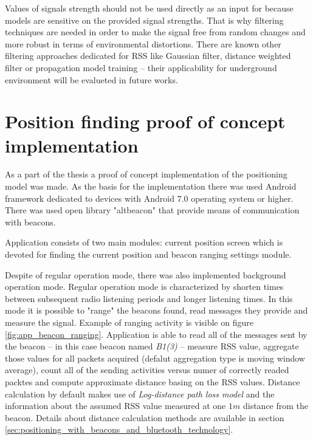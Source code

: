 \documentclass[../main.tex]{subfiles}
\begin{document}
Values of signals strength should not be used directly as an input for because models are sensitive on the provided signal strengths. That is why filtering techniques are needed in order to make the signal free from random changes and more robust in terms of environmental distortions. There are known other filtering approaches dedicated for RSS like Gaussian filter, distance weighted filter or propagation model training \cite{article_rssi_learning_and_filtering_for_navi} -- their applicability for underground environment will be evalueted in future works.


\section{Position finding proof of concept implementation} %
\label{sec:simple_position_finding_algorithm_implementation}

As a part of the thesis a proof of concept implementation of the positioning model was made. As the basis for the implementation there was used Android framework dedicated to devices with Android 7.0 operating system or higher. There was used open library "altbeacon" that provide means of communication with beacons.

Application consists of two main modules: current position screen which is devoted for finding the current position and beacon ranging settings module.

Despite of regular operation mode, there was also implemented background operation mode. Regular operation mode is characterized by shorten times between subsequent radio listening periods and longer listening times. In this mode it is possible to "range" the beacons found, read messages they provide and measure the signal. Example of ranging activity is visible on figure \ref{fig:app_beacon_ranging}. Application is able to read all of the messages sent by the beacon -- in this case beacon named \textit{B1(3)} -- measure RSS value, aggregate those values for all packets acquired (defalut aggregation type is moving window average), count all of the sending activities versus numer of correctly readed packtes and compute approximate distance basing on the RSS values. Distance calculation by default makes use of \textit{Log-distance path loss model} and the information about the assumed RSS value measured at one $1m$ distance from the beacon. Details about distance calculation methods are available in section \ref{sec:positioning_with_beacons_and_bluetooth_technology}.
\end{document}
